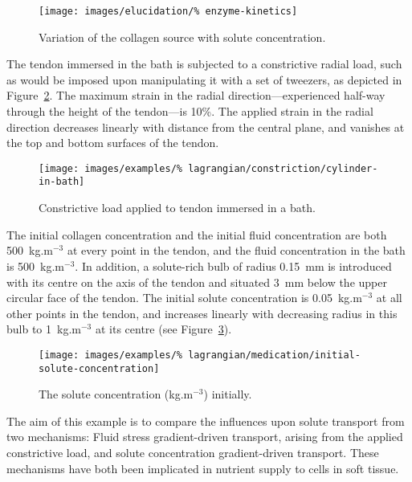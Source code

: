 \begin{figure}[!hpt]
  \centering
  \texttt{[image: images/elucidation/\%
    enzyme-kinetics]}
  \caption{Variation of the collagen source with solute
    concentration.}
  \label{eg3menten}
\end{figure}

The tendon immersed in the bath is subjected to a constrictive radial
load, such as would be imposed upon manipulating it with a set of
tweezers, as depicted in Figure~\ref{constrictload}. The maximum
strain in the radial direction---experienced half-way through the
height of the tendon---is 10\%. The applied strain in the radial
direction decreases linearly with distance from the central plane, and
vanishes at the top and bottom surfaces of the tendon.

\begin{figure}[!hpt]
  \centering
  \texttt{[image: images/examples/\%
    lagrangian/constriction/cylinder-in-bath]}
  \caption{Constrictive load applied to tendon immersed in a bath.}
  \label{constrictload}
\end{figure}

The initial collagen concentration and the initial fluid concentration
are both 500~kg.m$^{-3}$ at every point in the tendon, and the fluid
concentration in the bath is 500~kg.m$^{-3}$. In addition, a
solute-rich bulb of radius 0.15~mm is introduced with its centre on
the axis of the tendon and situated 3~mm below the upper circular face
of the tendon. The initial solute concentration is 0.05~kg.m$^{-3}$ at
all other points in the tendon, and increases linearly with decreasing
radius in this bulb to 1~kg.m$^{-3}$ at its centre (see
Figure~\ref{eg3ini}).

\begin{figure}[!hpt]
  \centering
  \texttt{[image: images/examples/\%
    lagrangian/medication/initial-solute-concentration]}
  \caption{The solute concentration (kg.m$^{-3}$) initially.}
  \label{eg3ini}
\end{figure}

The aim of this example is to compare the influences upon solute
transport from two mechanisms: Fluid stress gradient-driven transport,
arising from the applied constrictive load, and solute concentration
gradient-driven transport. These mechanisms have both been implicated
in nutrient supply to cells in soft tissue.

